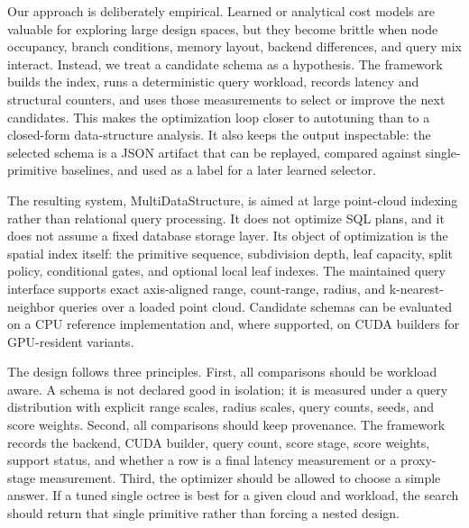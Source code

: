 Our approach is deliberately empirical. Learned or analytical cost models are valuable for exploring large design spaces, but they become brittle when node occupancy, branch conditions, memory layout, backend differences, and query mix interact. Instead, we treat a candidate schema as a hypothesis. The framework builds the index, runs a deterministic query workload, records latency and structural counters, and uses those measurements to select or improve the next candidates. This makes the optimization loop closer to autotuning than to a closed-form data-structure analysis. It also keeps the output inspectable: the selected schema is a JSON artifact that can be replayed, compared against single-primitive baselines, and used as a label for a later learned selector.

The resulting system, MultiDataStructure, is aimed at large point-cloud indexing rather than relational query processing. It does not optimize SQL plans, and it does not assume a fixed database storage layer. Its object of optimization is the spatial index itself: the primitive sequence, subdivision depth, leaf capacity, split policy, conditional gates, and optional local leaf indexes. The maintained query interface supports exact axis-aligned range, count-range, radius, and k-nearest-neighbor queries over a loaded point cloud. Candidate schemas can be evaluated on a CPU reference implementation and, where supported, on CUDA builders for GPU-resident variants.

The design follows three principles. First, all comparisons should be workload aware. A schema is not declared good in isolation; it is measured under a query distribution with explicit range scales, radius scales, query counts, seeds, and score weights. Second, all comparisons should keep provenance. The framework records the backend, CUDA builder, query count, score stage, score weights, support status, and whether a row is a final latency measurement or a proxy-stage measurement. Third, the optimizer should be allowed to choose a simple answer. If a tuned single octree is best for a given cloud and workload, the search should return that single primitive rather than forcing a nested design.

